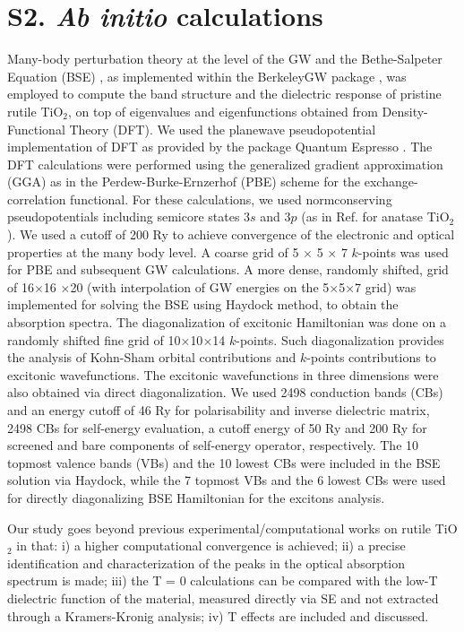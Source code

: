 \documentclass[aps,prl,twocolumn,amsfonts,nobibnotes,superscriptaddress,showpacs]{revtex4-1}
\begin{document}
\section{S2. \textit{Ab initio} calculations}
\label{AbInitio_Details}

Many-body perturbation theory at the level of the GW and the Bethe-Salpeter Equation (BSE) \cite{ref:hedin1, ref:hedin2, ref:onida}, as implemented within the BerkeleyGW package \cite{ref:deslippe}, was employed to compute the band structure and the dielectric response of pristine rutile TiO$_2$, on top of eigenvalues and eigenfunctions obtained from Density-Functional Theory (DFT). We used the planewave pseudopotential implementation of DFT as provided by the package Quantum Espresso \cite{giannozzi2009quantum}. The DFT calculations were performed using the generalized gradient approximation (GGA) as in the Perdew-Burke-Ernzerhof (PBE) scheme for the exchange-correlation functional. For these calculations, we used normconserving pseudopotentials \cite{ref:RRKJ} including semicore states $3s$ and $3p$ (as in Ref. \cite{ref:baldini_TiO2} for anatase TiO$_2$). We used a cutoff of 200 Ry to achieve convergence of the electronic and optical properties at the many body level. A coarse grid of 5 $\times$ 5 $\times$ 7 $k$-points was used for PBE and subsequent GW calculations.
A more dense, randomly shifted, grid of 16$\times$16 $\times$20 (with interpolation of GW energies on the 5$\times$5$\times$7 grid) was implemented for solving the BSE using Haydock method, to obtain the absorption spectra. The diagonalization of excitonic Hamiltonian was done on a randomly shifted fine grid of 10$\times$10$\times$14 $k$-points. Such diagonalization provides the analysis of Kohn-Sham orbital contributions and $k$-points contributions to excitonic wavefunctions. The excitonic wavefunctions in three dimensions were also obtained via direct diagonalization. We used 2498 conduction bands (CBs) and an energy cutoff of 46 Ry for polarisability and inverse dielectric matrix, 2498 CBs for self-energy evaluation, a cutoff energy of 50 Ry and 200 Ry for screened and bare components of self-energy operator, respectively. The 10 topmost valence bands (VBs) and the 10 lowest CBs were included in the BSE solution via Haydock, while the 7 topmost VBs and the 6 lowest CBs were used for directly diagonalizing BSE Hamiltonian for the excitons analysis.

Our study goes beyond previous experimental/computational works on rutile TiO$_2$ \cite{chiodo2010self, kang2010quasiparticle, landmann2012electronic, lawler2008optical} in that: i) a higher computational convergence is achieved; ii) a precise identification and characterization of the peaks in the optical absorption spectrum is made; iii) the T = 0 calculations can be compared with the low-T dielectric function of the material, measured directly via SE and not extracted through a Kramers-Kronig analysis; iv) T effects are included and discussed.
\end{document}
